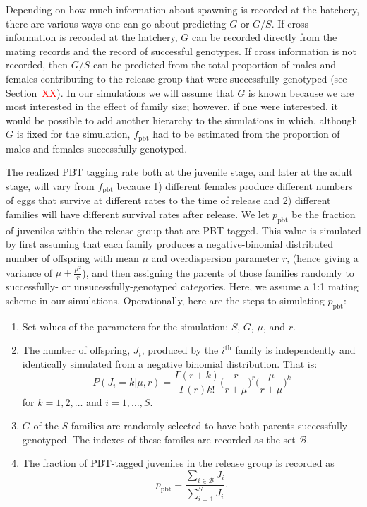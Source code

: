\documentclass[11pt]{article}
\newcommand{\thh}{^\mathrm{th}}
\begin{document}
 
  
Depending on how much information about spawning is recorded at the hatchery, there are various
ways one can go about predicting $G$ or $G/S$. 
If cross information is recorded at the
hatchery, $G$ can be recorded directly from the mating records and the record of successful genotypes.
If cross information is not recorded, then $G/S$ can be predicted from the total proportion of males and 
females contributing to the release group that were successfully genotyped (see Section~\textcolor{red}{XX}).
In our simulations we will assume that $G$ is known because we are most interested in the effect of family
size;  however, if one were interested, it would be possible to add another hierarchy to the simulations in which,
although $G$ is fixed for the simulation,  $f_\mathrm{pbt}$ had to be estimated from the proportion of males
and females successfully genotyped.


The realized PBT tagging rate both at the juvenile stage, and later at the adult stage,
will vary from $f_\mathrm{pbt}$ because 1) different females produce different
numbers of eggs that survive at different rates to the time of release and 2) different families
will have different survival rates after release.  We let $p_\mathrm{pbt}$ be the fraction of juveniles
within the release group that are PBT-tagged.  This value is simulated by first assuming that each
family produces a negative-binomial distributed number of offspring with mean $\mu$ and 
overdispersion parameter $r$, (hence giving a variance of $\mu + \frac{\mu^2}{r}$), and then
assigning the parents of those families randomly to successfully- or unsucessfully-genotyped
categories.  Here, we assume a 1:1 mating scheme in our simulations.  Operationally, here
are the steps to simulating $p_\mathrm{pbt}$:
\begin{enumerate}
\item Set values of the parameters for the simulation: $S$, $G$, $\mu$, and $r$.
\item The number of offspring, $J_i$, produced by the $i\thh$ family is independently and identically simulated 
from a negative binomial distribution.  That is:
\[
P(J_i = k | \mu, r) = \frac{\Gamma(r + k)}{\Gamma(r)k!}\biggl(\frac{r}{r+\mu}\biggr)^r 
\biggl(\frac{\mu}{r+\mu}\biggr)^k
\] 
for $k = 1, 2, \ldots$ and $i = 1,\ldots, S$.  
\item $G$ of the $S$ families are randomly selected to have both parents successfully genotyped. The
indexes of these familes are recorded as the set
$\mathcal{B}$.  
\item The fraction of PBT-tagged juveniles in the release group is recorded as
\[
p_\mathrm{pbt} = \frac{\sum_{i\in\mathcal{B}} J_i}{\sum_{i=1}^S J_i}.
\]
\end{enumerate}
 
\end{document}
